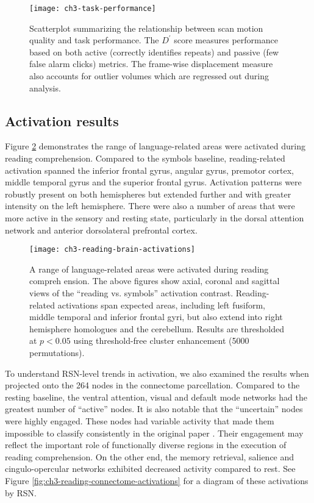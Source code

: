 \begin{figure}[t]
	\centering
	\texttt{[image: ch3-task-performance]}
    \caption[Description of scan motion quality and task performance]{Scatterplot summarizing the relationship between scan motion quality and task performance. The $D^\prime$ score measures performance based on both active (correctly identifies repeats) and passive (few false alarm clicks) metrics. The frame-wise displacement measure also accounts for outlier volumes which are regressed out during analysis.}
	\label{fig:ch3-task-performance}
\end{figure}

\subsection{Activation results}

Figure \ref{fig:ch3-reading-brain-activations} demonstrates the range of language-related areas were activated during reading comprehension. Compared to the symbols baseline, reading-related activation spanned the inferior frontal gyrus, angular gyrus, premotor cortex, middle temporal gyrus and the superior frontal gyrus. Activation patterns were robustly present on both hemispheres but extended further and with greater intensity on the left hemisphere. There were also a number of areas that were more active in the sensory and resting state, particularly in the dorsal attention network and anterior dorsolateral prefrontal cortex.

\begin{figure}[t]
	\centering
	\texttt{[image: ch3-reading-brain-activations]}
    \caption[A range of language-related areas were activated during reading comprehension]{A range of language-related areas were activated during reading compreh ension. The above figures show axial, coronal and sagittal views of the ``reading vs. symbols'' activation contrast. Reading-related activations span expected areas, including left fusiform, middle temporal and inferior frontal gyri, but also extend into right hemisphere homologues and the cerebellum. Results are thresholded at $p < 0.05$ using threshold-free cluster enhancement (5000 permutations).}
	\label{fig:ch3-reading-brain-activations}
\end{figure}

To understand RSN-level trends in activation, we also examined the results when projected onto the 264 nodes in the connectome parcellation. Compared to the resting baseline, the ventral attention, visual and default mode networks had the greatest number of ``active'' nodes. It is also notable that the ``uncertain'' nodes were highly engaged. These nodes had variable activity that made them impossible to classify consistently in the original paper \citep{Power2011}. Their engagement may reflect the important role of functionally diverse regions in the execution of reading comprehension. On the other end, the memory retrieval, salience and cingulo-opercular networks exhibited decreased activity compared to rest. See Figure \ref{fig:ch3-reading-connectome-activations} for a diagram of these activations by RSN. 

